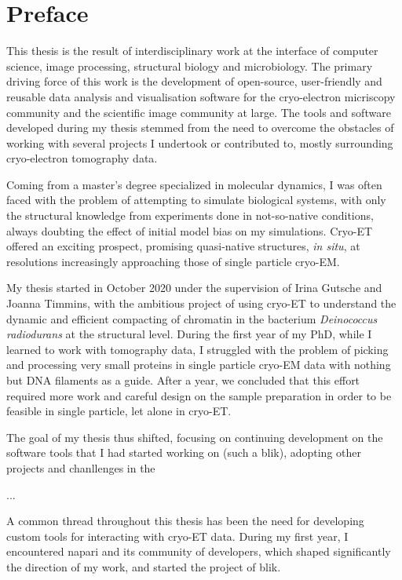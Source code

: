 \chapter{Preface}

This thesis is the result of interdisciplinary work at the interface of computer science, image processing, structural biology and microbiology.
The primary driving force of this work is the development of open-source, user-friendly and reusable data analysis and visualisation software for the cryo-electron micriscopy community and the scientific image community at large.
The tools and software developed during my thesis stemmed from the need to overcome the obstacles of working with several projects I undertook or contributed to, mostly surrounding cryo-electron tomography data.

Coming from a master's degree specialized in molecular dynamics, I was often faced with the problem of attempting to simulate biological systems, with only the structural knowledge from experiments done in not-so-native conditions, always doubting the effect of initial model bias on my simulations.
Cryo-ET offered an exciting prospect, promising quasi-native structures, \textit{in situ}, at resolutions increasingly approaching those of single particle cryo-EM.

My thesis started in October 2020 under the supervision of Irina Gutsche and Joanna Timmins, with the ambitious project of using cryo-ET to understand the dynamic and efficient compacting of chromatin in the bacterium \textit{Deinococcus radiodurans} at the structural level.
During the first year of my PhD, while I learned to work with tomography data, I struggled with the problem of picking and processing very small proteins in single particle cryo-EM data with nothing but DNA filaments as a guide.
After a year, we concluded that this effort required more work and careful design on the sample preparation in order to be feasible in single particle, let alone in cryo-ET.

The goal of my thesis thus shifted, focusing on continuing development on the software tools that I had started working on (such a blik), adopting other projects and chanllenges in the  

...

A common thread throughout this thesis has been the need for developing custom tools for interacting with cryo-ET data.
During my first year, I encountered napari and its community of developers, which shaped significantly the direction of my work, and started the project of blik.

